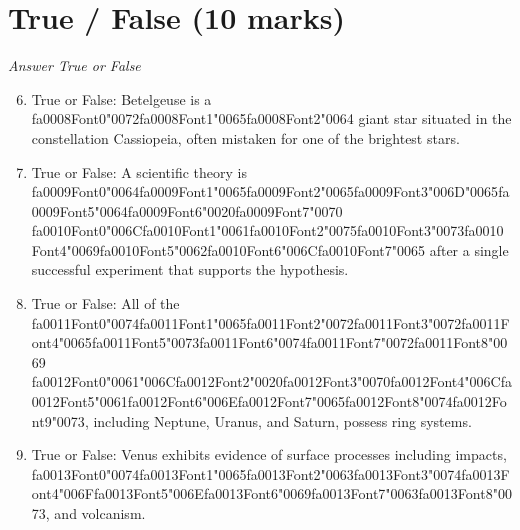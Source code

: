 \documentclass[12pt]{article}
\begin{document}
\section*{True / False (10 marks)}
\textit{Answer True or False}
\begin{enumerate}[label=\arabic*.]
\setcounter{enumi}{5}
\item True or False: Betelgeuse is a {\csname fa0008Font0\endcsname\char"0072}{\csname fa0008Font1\endcsname\char"0065}{\csname fa0008Font2\endcsname\char"0064} giant star situated in the constellation Cassiopeia, often mistaken for one of the brightest stars.
\item True or False: A scientific theory is {\csname fa0009Font0\endcsname\char"0064}{\csname fa0009Font1\endcsname\char"0065}{\csname fa0009Font2\endcsname\char"0065}{\csname fa0009Font3\endcsname\char"006D}{\char"0065}{\csname fa0009Font5\endcsname\char"0064}{\csname fa0009Font6\endcsname\char"0020}{\csname fa0009Font7\endcsname\char"0070} {\csname fa0010Font0\endcsname\char"006C}{\csname fa0010Font1\endcsname\char"0061}{\csname fa0010Font2\endcsname\char"0075}{\csname fa0010Font3\endcsname\char"0073}{\csname fa0010Font4\endcsname\char"0069}{\csname fa0010Font5\endcsname\char"0062}{\csname fa0010Font6\endcsname\char"006C}{\csname fa0010Font7\endcsname\char"0065} after a single successful experiment that supports the hypothesis.
\item True or False: All of the {\csname fa0011Font0\endcsname\char"0074}{\csname fa0011Font1\endcsname\char"0065}{\csname fa0011Font2\endcsname\char"0072}{\csname fa0011Font3\endcsname\char"0072}{\csname fa0011Font4\endcsname\char"0065}{\csname fa0011Font5\endcsname\char"0073}{\csname fa0011Font6\endcsname\char"0074}{\csname fa0011Font7\endcsname\char"0072}{\csname fa0011Font8\endcsname\char"0069} {\csname fa0012Font0\endcsname\char"0061}{\char"006C}{\csname fa0012Font2\endcsname\char"0020}{\csname fa0012Font3\endcsname\char"0070}{\csname fa0012Font4\endcsname\char"006C}{\csname fa0012Font5\endcsname\char"0061}{\csname fa0012Font6\endcsname\char"006E}{\csname fa0012Font7\endcsname\char"0065}{\csname fa0012Font8\endcsname\char"0074}{\csname fa0012Font9\endcsname\char"0073}, including Neptune, Uranus, and Saturn, possess ring systems.
\item True or False: Venus exhibits evidence of surface processes including impacts, {\csname fa0013Font0\endcsname\char"0074}{\csname fa0013Font1\endcsname\char"0065}{\csname fa0013Font2\endcsname\char"0063}{\csname fa0013Font3\endcsname\char"0074}{\csname fa0013Font4\endcsname\char"006F}{\csname fa0013Font5\endcsname\char"006E}{\csname fa0013Font6\endcsname\char"0069}{\csname fa0013Font7\endcsname\char"0063}{\csname fa0013Font8\endcsname\char"0073}, and volcanism.

\end{enumerate}
\end{document}
